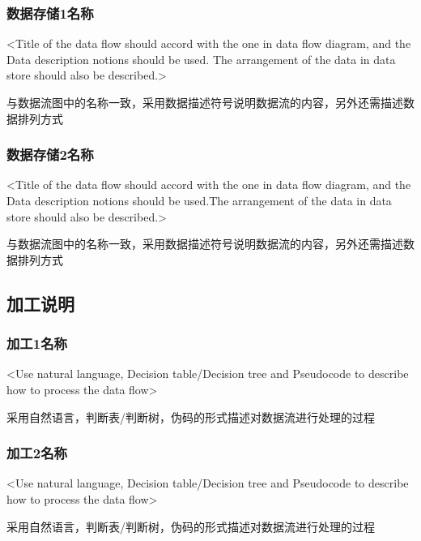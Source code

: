 \subsubsection{数据存储1名称}
<Title of  the data flow should accord with the one in data flow diagram, and the Data description notions should be used. The arrangement of the data in data store should also be described.>

与数据流图中的名称一致，采用数据描述符号说明数据流的内容，另外还需描述数据排列方式

\subsubsection{数据存储2名称}
<Title of  the data flow should accord with the one in data flow diagram, and the Data description notions should be used.The arrangement of the data in data store should also be described.>

与数据流图中的名称一致，采用数据描述符号说明数据流的内容，另外还需描述数据排列方式

\subsection{加工说明}
\subsubsection{加工1名称}
<Use natural language, Decision table/Decision tree and Pseudocode to describe how to process the data flow>

采用自然语言，判断表/判断树，伪码的形式描述对数据流进行处理的过程

\subsubsection{加工2名称}
<Use natural language, Decision table/Decision tree and Pseudocode to describe how to process the data flow>

采用自然语言，判断表/判断树，伪码的形式描述对数据流进行处理的过程
